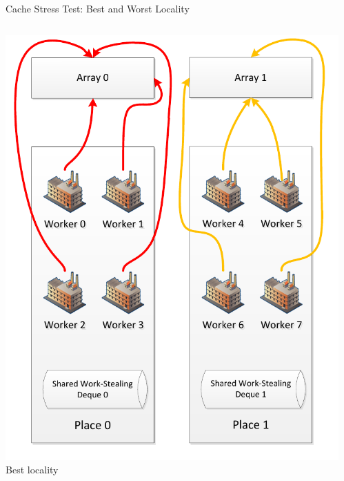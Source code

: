 \begin{frame}{Cache Stress Test: Best and Worst Locality}
  \begin{columns}[c]
    \begin{column}{0.50\textwidth}
      \begin{center}
        \includegraphics[width=\textwidth]{figures/cache-stress-test-mafushi-best} \\
        \tiny{Best locality}     
      \end{center}
    \end{column}
    \begin{column}{0.50\textwidth}
      \begin{center}

\end{center}
\end{column}
\end{columns}
\end{frame}
